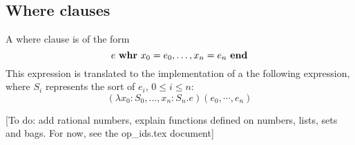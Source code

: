 \documentclass[a4paper,fleqn]{article}
\newcommand{\frm}[1]{\mbox{\ensuremath{#1}}}
\newcommand{\kwwhr}{{\bf whr}}
\newcommand{\kwend}{{\bf end}}
\begin{document}
\subsection{Where clauses}

A where clause is of the form
\[e\ \kwwhr\ x_{0} = e_{0}, \ldots, x_{n} = e_{n}\ \kwend\]
This expression is translated to the implementation of a the following
expression, where \frm{S_{i}} represents the sort of \frm{e_{i}}, \frm{0 \leq i
\leq n}:
\[(\lambda x_{0}{:}S_{0}, \ldots, x_{n}{:}S_{n}. e)(e_{0},\cdots,e_{n})\]

[To do: add rational numbers, explain functions defined on numbers, lists, sets and bags. For now, see the op\_ids.tex document]
\end{document}
